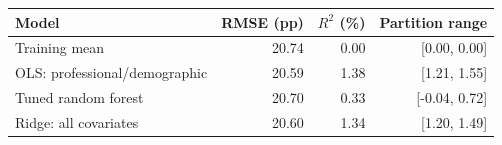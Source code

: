 \begin{tabular}{lrrr}
\toprule
Model & RMSE (pp) & $R^2$ (\%) & Partition range \\
\midrule
Training mean & 20.74 & 0.00 & [0.00, 0.00] \\
OLS: professional/demographic & 20.59 & 1.38 & [1.21, 1.55] \\
Tuned random forest & 20.70 & 0.33 & [-0.04, 0.72] \\
Ridge: all covariates & 20.60 & 1.34 & [1.20, 1.49] \\
\bottomrule
\end{tabular}
